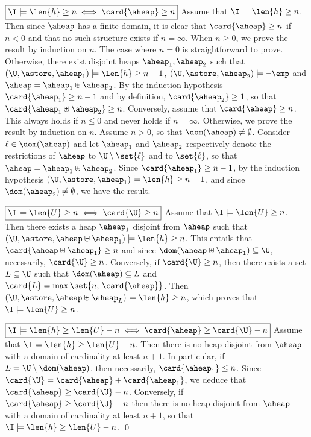 {  \noindent
  $\boxed{\I \models \len{h} \geq n\iff \card{\aheap} \geq n}$ Assume
  that $\I\models \len{h} \geq n$. Then since $\aheap$ has a finite
  domain, it is clear that $\card{\aheap}\geq n$ if $n< 0$ and that no
  such structure exists if $n = \infty$. When $n\geq 0$, we prove the
  result by induction on $n$. The case where $n=0$ is straightforward
  to prove. Otherwise, there exist disjoint heaps $\aheap_1,\aheap_2$
  such that $(\U, \astore, \aheap_1)\models \len{h}\geq n-1$, $(\U,
  \astore, \aheap_2)\models \neg\emp$ and $\aheap =
  \aheap_1\uplus\aheap_2$. By the induction hypothesis
  $\card{\aheap_1} \geq n-1$ and by definition, $\card{\aheap_2} \geq
  1$, so that $\card{\aheap_1\uplus\aheap_2} \geq n$. Conversely,
  assume that $\card{\aheap} \geq n$. This always holds if $n\leq 0$
  and never holds if $n=\infty$. Otherwise, we prove the result by
  induction on $n$. Assume $n>0$, so that $\dom(\aheap) \neq
  \emptyset$. Consider $\ell\in \dom(\aheap)$ and let $\aheap_1$ and
  $\aheap_2$ respectively denote the restrictions of $\aheap$ to
  $\U\setminus\set{\ell}$ and to $\set{\ell}$, so that $\aheap =
  \aheap_1\uplus\aheap_2$. Since $\card{\aheap_1}\geq n-1$, by the
  induction hypothesis $(\U,\astore, \aheap_1)\models \len{h}\geq
  n-1$, and since $\dom(\aheap_2) \neq \emptyset$, we have the result.
  
  \noindent
  $\boxed{\I \models \len{U} \geq n \iff \card{\U} \geq n}$ Assume
  that $\I\models \len{U}\geq n$. Then there exists a heap $\aheap_1$
  disjoint from $\aheap$ such that $(\U,\astore,\aheap\uplus\aheap_1)
  \models \len{h}\geq n$. This entails that
  $\card{\aheap\uplus\aheap_1}\geq n$ and since
  $\dom(\aheap\uplus\aheap_1)\subseteq \U$, necessarily,
  $\card{\U}\geq n$. Conversely, if $\card{\U}\geq n$, then there
  exists a set $L\subseteq \U$ such that $\dom(\aheap)\subseteq L$ and
  $\card{L} = \max \set{n,\,\card{\aheap}}$. Then $(\U,\astore,
  \aheap\uplus\aheap_L) \models \len{h}\geq n$, which proves that
  $\I\models \len{U}\geq n$.

  \noindent
  $\boxed{\I \models \len{h} \geq \len{U} - n \iff \card{\aheap} \geq
    \card{\U} - n}$ Assume that $\I\models \len{h}\geq \len{U} -
  n$. Then there is no heap disjoint from $\aheap$ with a domain of
  cardinality at least $n+1$. In particular, if $L = \U\setminus
  \dom(\aheap)$, then necessarily, $\card{\aheap_1} \leq n$. Since
  $\card{\U} = \card{\aheap} +\card{\aheap_1}$, we deduce that
  $\card{\aheap} \geq \card{\U} - n$. Conversely, if $\card{\aheap}
  \geq \card{\U} - n$ then there is no heap disjoint from $\aheap$
  with a domain of cardinality at least $n+1$, so that $\I\models
  \len{h} \geq \len{U} - n$. \qed
  
}
